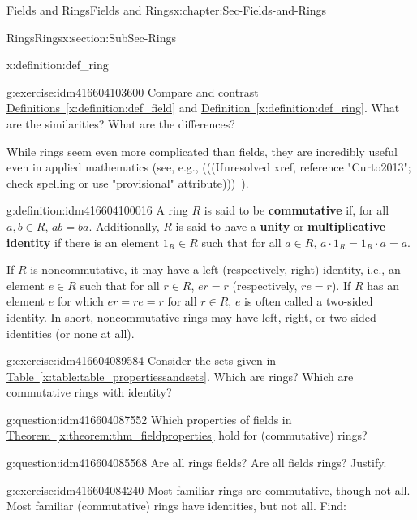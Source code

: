 \documentclass[oneside,10pt,]{book}
\newcommand{\terminology}[1]{\textbf{#1}}
\numberwithin{equation}{section}
\begin{document}
\begin{chapterptx}{Fields and Rings}{}{Fields and Rings}{}{}{x:chapter:Sec-Fields-and-Rings}
\begin{sectionptx}{Rings}{}{Rings}{}{}{x:section:SubSec-Rings}
\begin{definition}{}{x:definition:def_ring}
%
\end{definition}
%
\begin{inlineexercise}{}{g:exercise:idm416604103600}%
Compare and contrast \hyperref[x:definition:def_field]{Definitions~\ref{x:definition:def_field}} and \hyperref[x:definition:def_ring]{Definition~\ref{x:definition:def_ring}}. What are the similarities? What are the differences?%
\end{inlineexercise}
While rings seem even more complicated than fields, they are incredibly useful even in applied mathematics (see, e.g., {(((Unresolved xref, reference "Curto2013"; check spelling or use "provisional" attribute)))}\hyperlink{}{~}).%
\begin{definition}{}{g:definition:idm416604100016}%
A ring \(R\) is said to be \terminology{commutative} if, for all \(a,b\in R\), \(ab = ba\). Additionally, \(R\) is said to have a \terminology{unity} or \terminology{multiplicative identity} if there is an element \(1_R\in R\) such that for all \(a\in R\), \(a \cdot 1_R = 1_R \cdot a= a\).%
\end{definition}
If \(R\) is noncommutative, it may have a left (respectively, right) identity, i.e., an element \(e\in R\) such that for all \(r\in R\), \(er = r\) (respectively, \(re = r\)). If \(R\) has an element \(e\) for which \(er = re = r\) for all \(r\in R\), \(e\) is often called a two-sided identity. In short, noncommutative rings may have left, right, or two-sided identities (or none at all).%
\begin{inlineexercise}{}{g:exercise:idm416604089584}%
Consider the sets given in \hyperref[x:table:table_propertiessandsets]{Table~\ref{x:table:table_propertiessandsets}}. Which are rings? Which are commutative rings with identity?%
\end{inlineexercise}
\begin{question}{}{g:question:idm416604087552}%
Which properties of fields in \hyperref[x:theorem:thm_fieldproperties]{Theorem~\ref{x:theorem:thm_fieldproperties}} hold for (commutative) rings?%
\end{question}
\begin{question}{}{g:question:idm416604085568}%
Are all rings fields? Are all fields rings? Justify.%
\end{question}
\begin{inlineexercise}{}{g:exercise:idm416604084240}%
Most familiar rings are commutative, though not all. Most familiar (commutative) rings have identities, but not all. Find:%

\end{inlineexercise}
\end{sectionptx}
\end{chapterptx}
\end{document}
